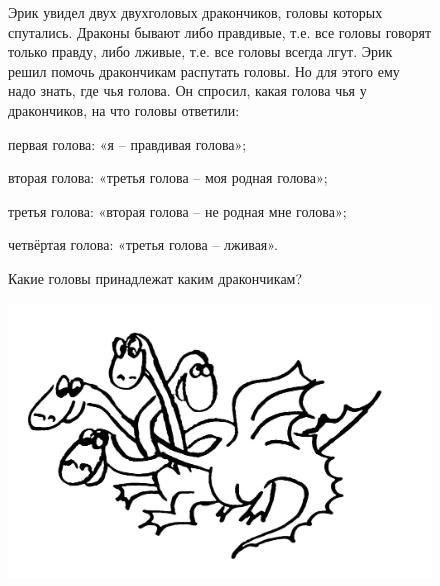 \begin{figure}[H]
\begin{minipage}{0.69\linewidth}\setlength{\parindent}{1.5em}
    \begin{thm}
        Эрик увидел двух двухголовых дракончиков, головы которых спутались. Драконы бывают либо правдивые, т.е. все головы говорят только правду, либо лживые, т.е. все головы всегда лгут. Эрик решил помочь дракончикам распутать головы. Но для этого ему надо знать, где чья голова. Он спросил, какая голова чья у дракончиков, на что головы ответили: 
        \par первая голова: «я – правдивая голова»;
        \par вторая голова: «третья голова – моя родная голова»; 
        \par третья голова: «вторая голова – не родная мне голова»; 
        \par четвёртая голова: «третья голова – лживая». 
        \par Какие головы принадлежат каким дракончикам?
    \end{thm}
\end{minipage}
\hfill
\begin{minipage}{0.3\linewidth}
    \includegraphics[width=0.95\columnwidth]{img/7.0 2 drakon.jpg}
\end{minipage}
\end{figure} 

